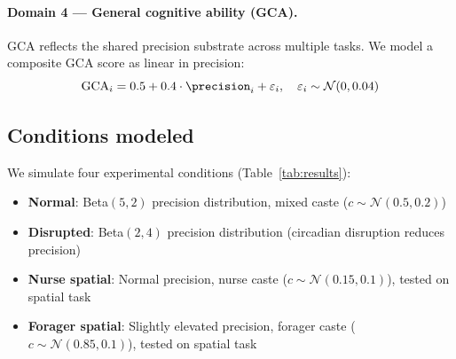 \paragraph{Domain 4 --- General cognitive ability (GCA).}
GCA reflects the shared precision substrate across multiple tasks. We model a composite GCA score
as linear in precision:
\begin{equation}
  \text{GCA}_i = 0.5 + 0.4 \cdot \precision_i + \varepsilon_i, \quad \varepsilon_i \sim \mathcal{N}(0, 0.04)
\end{equation}

\subsection*{Conditions modeled}
\label{sec:model:conditions}

We simulate four experimental conditions (Table~\ref{tab:results}):
\begin{itemize}
  \item \textbf{Normal}: Beta$(5,2)$ precision distribution, mixed caste ($c \sim \mathcal{N}(0.5, 0.2)$)
  \item \textbf{Disrupted}: Beta$(2,4)$ precision distribution (circadian disruption reduces precision)
  \item \textbf{Nurse spatial}: Normal precision, nurse caste ($c \sim \mathcal{N}(0.15, 0.1)$), tested on spatial task
  \item \textbf{Forager spatial}: Slightly elevated precision, forager caste ($c \sim \mathcal{N}(0.85, 0.1)$), tested on spatial task
\end{itemize}
